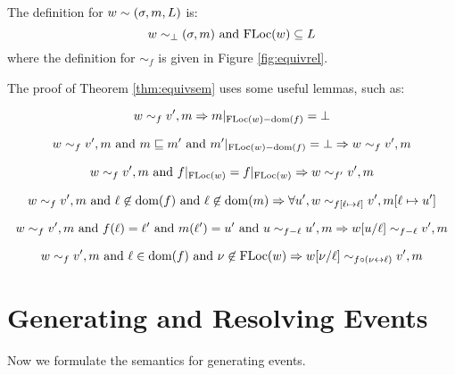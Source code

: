 \documentclass{article}
\begin{document}
The definition for $w\sim(\sigma,m,L)$ is:
\[w\sim_\bot(\sigma,m)\text{ and }\text{FLoc}(w)\subseteq L\]
where the definition for $\sim_f$ is given in Figure \ref{fig:equivrel}.

The proof of Theorem \ref{thm:equivsem} uses some useful lemmas, such as:
\begin{lem}
	\[w\sim_f v',m\Rightarrow m|_{\text{FLoc}(w)-\text{dom}(f)}=\bot\]
\end{lem}

\begin{lem}
	\[w\sim_f v',m\text{ and }m\sqsubseteq m'\text{ and }m'|_{\text{FLoc}(w)-\text{dom}(f)}=\bot\Rightarrow w\sim_f v',m\]
\end{lem}

\begin{lem}
	\[w\sim_f v',m\text{ and }f|_{\text{FLoc}(w)}=f|_{\text{FLoc}(w)}\Rightarrow w\sim_{f'}v',m\]
\end{lem}

\begin{lem}
	\[w\sim_f v',m\text{ and }\ell\not\in\text{dom}(f)\text{ and }\ell\not\in\text{dom}(m)\Rightarrow\forall u',w\sim_{f[\ell\mapsto\ell]}v',m[\ell\mapsto u']\]
\end{lem}

\begin{lem}
	\[w\sim_f v',m\text{ and }f(\ell)=\ell'\text{ and }m(\ell')=u'\text{ and }u\sim_{f-\ell}u',m\Rightarrow w[u/\ell]\sim_{f-\ell}v',m\]
\end{lem}

\begin{lem}
	\[w\sim_f v',m\text{ and }\ell\in\text{dom}(f)\text{ and }\nu\not\in\text{FLoc}(w)\Rightarrow w[\nu/\ell]\sim_{f\circ(\nu\leftrightarrow\ell)}v',m\]
\end{lem}

\section{Generating and Resolving Events}
Now we formulate the semantics for generating events.
\end{document}
